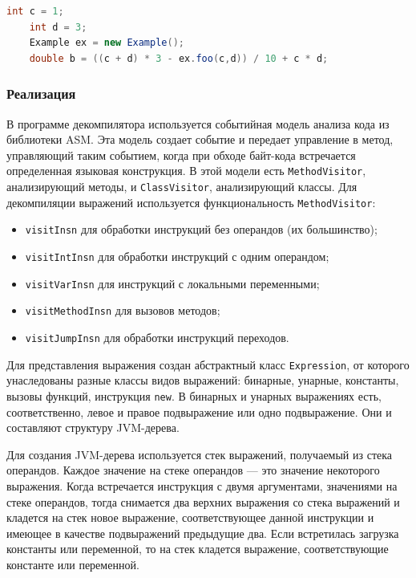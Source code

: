 \documentclass[14pt]{extarticle}
\begin{document}
\begin{lstlisting}[label=decompiled-example,caption = Пример кода выражения в JVM без переходов, frame = single, language = JAVA]
	int c = 1; 
	int d = 3; 
	Example ex = new Example();
	double b = ((c + d) * 3 - ex.foo(c,d)) / 10 + c * d; 
\end{lstlisting} 

\subsubsection*{Реализация}
В программе декомпилятора используется событийная модель анализа кода из библиотеки ASM. Эта модель создает событие и передает управление в метод, управляющий таким событием, когда при обходе байт-кода встречается определенная языковая конструкция. В этой модели есть \texttt{MethodVisitor}, анализирующий методы, и \texttt{ClassVisitor}, анализирующий классы. Для декомпиляции выражений используется функциональность \texttt{MethodVisitor}:
\begin{itemize}
\item \texttt{visitInsn} для обработки инструкций без операндов (их большинство);
\item \texttt{visitIntInsn} для обработки инструкций с одним операндом;
\item \texttt{visitVarInsn} для инструкций с локальными переменными;
\item \texttt{visitMethodInsn} для вызовов методов;
\item \texttt{visitJumpInsn} для обработки инструкций переходов.
\end{itemize}

Для представления выражения создан абстрактный класс \texttt{Expression}, от которого унаследованы разные классы видов выражений: бинарные, унарные, константы, вызовы функций, инструкция \texttt{new}. В бинарных и унарных выражениях есть, соответственно, левое и правое подвыражение или одно подвыражение. Они и составляют структуру JVM-дерева.

Для создания JVM-дерева используется стек выражений, получаемый из стека операндов. Каждое значение на стеке операндов --- это значение некоторого выражения. Когда встречается инструкция с двумя аргументами, значениями на стеке операндов, тогда снимается два верхних выражения со стека выражений и кладется на стек новое выражение, соответствующее данной инструкции и имеющее в качестве подвыражений предыдущие два. Если встретилась загрузка константы или переменной, то на стек кладется выражение, соответствующие константе или переменной. 
\end{document}
